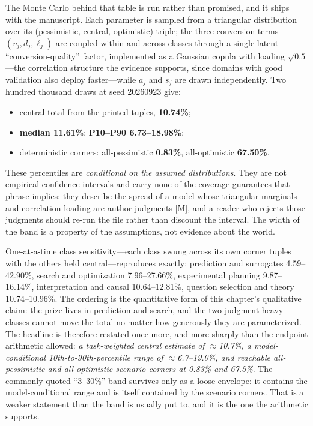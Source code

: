 The Monte Carlo behind that table is run rather than promised, and it ships with the manuscript. Each parameter is sampled from a triangular distribution over its (pessimistic, central, optimistic) triple; the three conversion terms $(v_j, d_j, \ell_j)$ are coupled within and across classes through a single latent ``conversion-quality'' factor, implemented as a Gaussian copula with loading $\sqrt{0.5}$---the correlation structure the evidence supports, since domains with good validation also deploy faster---while $a_j$ and $s_j$ are drawn independently. Two hundred thousand draws at seed 20260923 give:

\begin{itemize}\itemsep2pt
  \item central total from the printed tuples, \textbf{10.74\%};
  \item \textbf{median 11.61\%}; \textbf{P10--P90 6.73--18.98\%};
  \item deterministic corners: all-pessimistic \textbf{0.83\%}, all-optimistic \textbf{67.50\%}.
\end{itemize}

These percentiles are \emph{conditional on the assumed distributions}. They are not empirical confidence intervals and carry none of the coverage guarantees that phrase implies: they describe the spread of a model whose triangular marginals and correlation loading are author judgments [M], and a reader who rejects those judgments should re-run the file rather than discount the interval. The width of the band is a property of the assumptions, not evidence about the world.

One-at-a-time class sensitivity---each class swung across its own corner tuples with the others held central---reproduces exactly: prediction and surrogates 4.59--42.90\%, search and optimization 7.96--27.66\%, experimental planning 9.87--16.14\%, interpretation and causal 10.64--12.81\%, question selection and theory 10.74--10.96\%. The ordering is the quantitative form of this chapter's qualitative claim: the prize lives in prediction and search, and the two judgment-heavy classes cannot move the total no matter how generously they are parameterized. The headline is therefore restated once more, and more sharply than the endpoint arithmetic allowed: \emph{a task-weighted central estimate of $\approx$10.7\%, a model-conditional 10th-to-90th-percentile range of $\approx$6.7--19.0\%, and reachable all-pessimistic and all-optimistic scenario corners at 0.83\% and 67.5\%}. The commonly quoted ``3--30\%'' band survives only as a loose envelope: it contains the model-conditional range and is itself contained by the scenario corners. That is a weaker statement than the band is usually put to, and it is the one the arithmetic supports.


